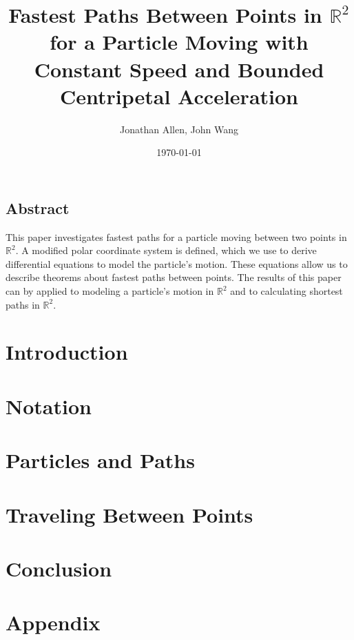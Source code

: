 \documentclass[12pt]{amsart}   %
\newcommand{\R}{\mathbb R}
\begin{document}
\graphicspath{ {figures/} }

\title[Fastest Paths in R2]{Fastest Paths Between Points in $\R^2$ for a Particle Moving with Constant Speed and Bounded Centripetal Acceleration} 
 
\author{Jonathan Allen, John Wang}
\date{\today}

\maketitle

\subsection*{Abstract}

This paper investigates fastest paths for a particle moving between two points in $\R^2$. A modified polar coordinate system is defined, which we use to derive differential equations to model the particle's motion. These equations allow us to describe theorems about fastest paths between points. The results of this paper can by applied to modeling a particle's motion in $\R^2$ and to calculating shortest paths in $\R^2$. 

\section{Introduction}


\section{Notation}


\section{Particles and Paths}


\section{Traveling Between Points}


\section{Conclusion}


\section*{Appendix}



\end{document}
